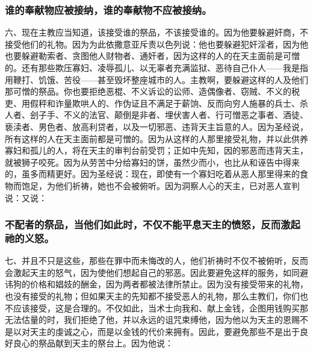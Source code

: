 
\subsubsection{谁的奉献物应被接纳，谁的奉献物不应被接纳。}

六、现在主教应当知道，该接受谁的祭品，不该接受谁的。因为他要躲避奸商，不接受他们的礼物。因为为此依撒意亚斥责以色列说：他也要躲避犯奸淫者，因为他也要躲避勒索者、贪图他人财物者、通奸者，因为这样的人的在天主面前是可憎的。还有那些欺压寡妇、凌辱孤儿、以无辜者充满监狱、恶待自己仆人——我是指用鞭打、饥饿、苦役——甚至毁坏整座城市的人。主教啊，要躲避这样的人及他们那可憎的祭品。你也要拒绝恶棍、不义诉讼的讼师、造偶像者、窃贼、不义的税吏、用假秤和诈量欺哄人的、作伪证且不满足于薪饷、反而向穷人施暴的兵士、杀人者、刽子手、不义的法官、颠倒是非者、埋伏害人者、行可憎恶之事者、酒徒、亵渎者、男色者、放高利贷者，以及一切邪恶、违背天主旨意的人。因为圣经说，所有这样的人在天主面前都是可憎的。因为从这样的人那里接受礼物，并以此供养寡妇和孤儿的人，将在天主的审判台前受罚；正如中先知，因的邪恶而违背天主，就被狮子咬死。因为从劳苦中分给寡妇的饼，虽然少而小，也比从和诬告中得来的，虽多而精更好。因为圣经说：现在，即使有一个寡妇吃着从恶人那里得来的食物而饱足，为他们祈祷，她也不会被俯听。因为洞察人心的天主，已对恶人宣判说：又说：\par


\subsubsection{不配者的祭品，当他们如此时，不仅不能平息天主的愤怒，反而激起祂的义怒。}

七、并且不只是这些，那些在罪中而未悔改的人，他们祈祷时不仅不被俯听，反而会激起天主的怒气，因为使他们想起自己的邪恶。因此要避免这样的服务，如同避讳狗的价格和娼妓的酬金，因为两者都被法律所禁止。因为没有接受带来的礼物，也没有接受的礼物；但如果天主的先知都不接受恶人的礼物，那么主教们，你们也不应该接受，这是合理的。不仅如此，当术士向我和、献上金钱，企图用钱购买那无法估量的时，我们拒绝了他，并以永远的诅咒束缚他，因为他以为天主的恩赐不是以对天主的虔诚之心，而是以金钱的代价来拥有。因此，要避免那些不是出于良好良心的祭品献到天主的祭台上。因为他说：\par

